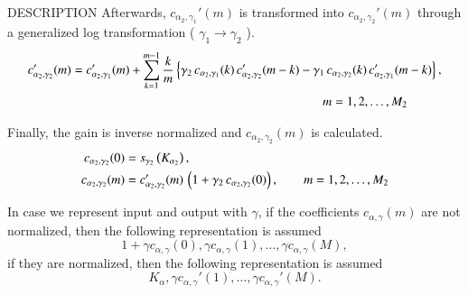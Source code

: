 \begin{qsection}{DESCRIPTION}
Afterwards, $c_{\alpha_2,\gamma_1}'(m)$ is transformed into 
$c_{\alpha_2,\gamma_2}'(m)$ through a generalized log transformation
( $\gamma_1 \rightarrow \gamma_2$ ).
\begin{align}
c_{\alpha_2,\gamma_2}'(m) &=
        c_{\alpha_2,\gamma_1}'(m)+\sum_{k=1}^{m-1} \frac{k}{m}
          \left\{ \gamma_2\,c_{\alpha_2,\gamma_1}(k)\,
          c_{\alpha_2,\gamma_2}'(m-k) 
 -\gamma_1\,c_{\alpha_2,\gamma_2}(k)\,
          c_{\alpha_2,\gamma_1}'(m-k) \right\},  \notag \\
          &\hspace{70mm} m = 1, 2, \dots, M_2 \notag
\end{align}

Finally, the gain is inverse normalized and $c_{\alpha_2,\gamma_2}(m)$
is calculated.
\begin{align}
c_{\alpha_2,\gamma_2}(0) &= 
        s_{\gamma_2}\left(K_{\alpha_2}\right), \notag \\
c_{\alpha_2,\gamma_2}(m) &= 
          c_{\alpha_2,\gamma_2}'(m)\,\left(1+\gamma_2\, 
          c_{\alpha_2,\gamma_2}(0)\right), 
          \qquad m = 1,2,\dots, M_2 \notag
\end{align}

In case we represent input and output with $\gamma$,
if the coefficients $c_{\alpha,\gamma}(m)$ are not normalized, then
the following representation is assumed
\begin{displaymath}
1+\gamma c_{\alpha,\gamma}(0), \gamma c_{\alpha,\gamma}(1), \dots, \gamma c_{\alpha,\gamma}(M),
\end{displaymath}
if they are normalized, then
the following representation is assumed
\begin{displaymath}
K_\alpha,\gamma c_{\alpha,\gamma}'(1),\dots, \gamma c_{\alpha,\gamma}'(M).
\end{displaymath}

\end{qsection}

